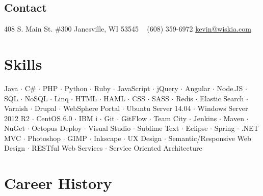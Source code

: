 \documentclass[]{clean-resume}
\begin{document}



\begin{aside}
  \section{Contact}
    408 S. Main St. \#300
	Janesville, WI 53545
    ~
    (608) 359-6972
    \href{mailto:kevin@wiskia.com.com?subject=Resume}{kevin@wiskia.com}
\end{aside}


\section{Skills}

\vspace{.25cm}

\begin{centering}
{ \small
	Java $\cdot$
	C\# $\cdot$
	PHP $\cdot$
	Python $\cdot$
	Ruby $\cdot$
	JavaScript $\cdot$
	jQuery $\cdot$
	Angular $\cdot$
	Node.JS $\cdot$
	SQL $\cdot$
	NoSQL $\cdot$
	Linq $\cdot$
	HTML $\cdot$
	HAML $\cdot$
	CSS $\cdot$
	SASS $\cdot$
	Redis $\cdot$
	Elastic Search $\cdot$
	Varnish $\cdot$
	Drupal $\cdot$
	WebSphere Portal $\cdot$
	Ubuntu Server 14.04 $\cdot$
	Windows Server 2012 R2 $\cdot$
	CentOS 6.0 $\cdot$
	IBM i $\cdot$
	Git $\cdot$
	GitFlow $\cdot$
	Team City $\cdot$
	Jenkins $\cdot$
	Maven $\cdot$
	NuGet $\cdot$
	Octopus Deploy $\cdot$
	Visual Studio $\cdot$
	Sublime Text $\cdot$
	Eclipse $\cdot$
	Spring $\cdot$
	.NET MVC $\cdot$
	Photoshop $\cdot$
	GIMP $\cdot$
	Inkscape $\cdot$
	UX Design $\cdot$
	Semantic/Responsive Web Design $\cdot$
	RESTful Web Services $\cdot$
	Service Oriented Architecture
}
\end{centering}

\vspace{.25cm}

\section{Career History}
\end{document}
